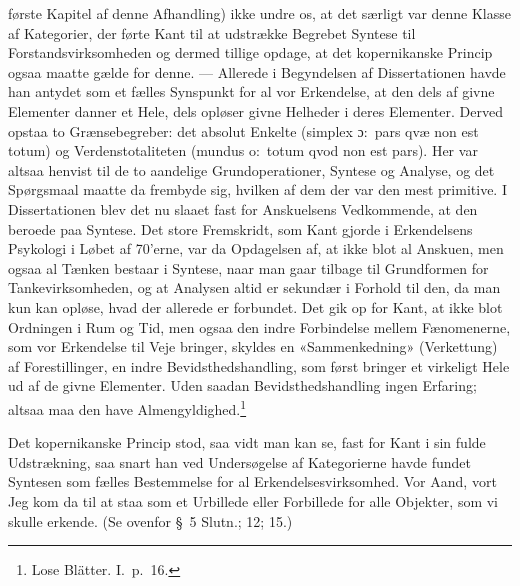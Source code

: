 \documentclass[12pt,a4paper]{article}
\newcommand{\apage}[1]{\marginnote{\footnotesize\textit{[#1]}}}
\begin{document}
første Kapitel af denne Afhandling) ikke undre os, at det særligt var
denne Klasse af Kategorier, der førte Kant til at udstrække Begrebet
Syntese til Forstandsvirksomheden og dermed tillige opdage, at det
kopernikanske Princip ogsaa maatte gælde for denne. --- Allerede i
Begyndelsen af Dissertationen havde han antydet som et fælles Synspunkt
for al vor Erkendelse, at den dels af givne Elementer \apage{54}  danner et Hele,
dels opløser givne Helheder i deres Elementer. Derved opstaa to
Grænsebegreber: det absolut Enkelte (simplex ɔ:\ pars
qvæ non est totum) og Verdenstotaliteten (mundus o:\
totum qvod non est pars). Her var altsaa henvist til de to
aandelige Grundoperationer, Syntese og Analyse, og det Spørgsmaal maatte
da frembyde sig, hvilken af dem der var den mest primitive. I
Dissertationen blev det nu slaaet fast for Anskuelsens Vedkommende, at
den beroede paa Syntese. Det store Fremskridt, som Kant gjorde i
Erkendelsens Psykologi i Løbet af 70'erne, var da Opdagelsen af, at ikke
blot al Anskuen, men ogsaa al Tænken bestaar i Syntese, naar man gaar
tilbage til Grundformen for Tankevirksomheden, og at Analysen altid er
sekundær i Forhold til den, da man kun kan opløse, hvad der allerede er
forbundet. Det gik op for Kant, at ikke blot Ordningen i Rum og Tid, men
ogsaa den indre Forbindelse mellem Fænomenerne, som vor Erkendelse til
Veje bringer, skyldes en «Sammenkedning» (Verkettung) af
Forestillinger, en indre Bevidsthedshandling, som først bringer et
virkeligt Hele ud af de givne Elementer. Uden saadan Bevidsthedshandling
ingen Erfaring; altsaa maa den have
Almengyldighed.\footnote{Lose Blätter. I.\ p.\ 16.}

Det kopernikanske Princip stod, saa vidt man kan se, fast for Kant i sin
fulde Udstrækning, saa snart han ved Undersøgelse af Kategorierne havde
fundet Syntesen som fælles Bestemmelse for al Erkendelsesvirksomhed. Vor
Aand, vort Jeg kom da til at staa som et Urbillede eller Forbillede for
alle Objekter, som vi skulle erkende. (Se ovenfor §\ 5 Slutn.; 12; 15.)
\end{document}
